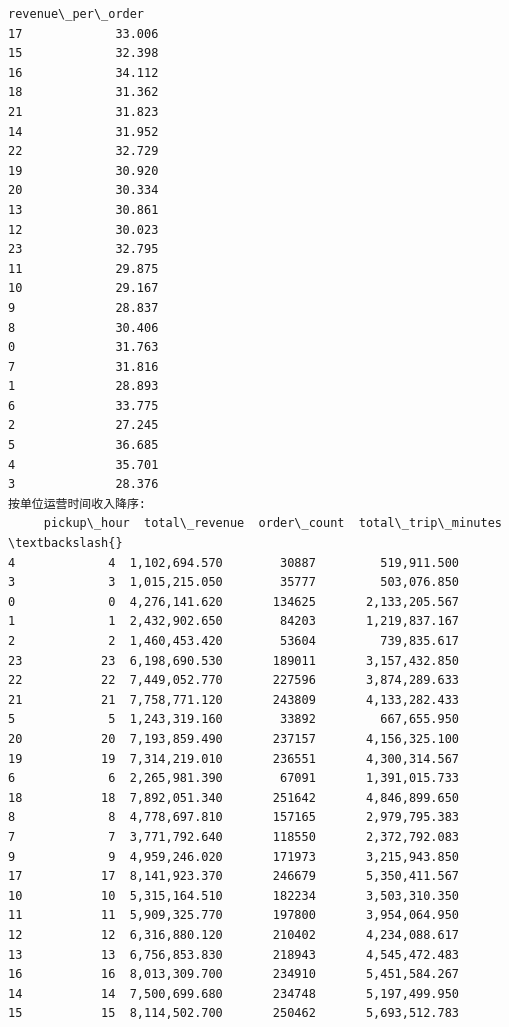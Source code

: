 \documentclass[11pt]{article}
\begin{document}
\begin{Verbatim}[commandchars=\\\{\}]
    revenue\_per\_order
17             33.006
15             32.398
16             34.112
18             31.362
21             31.823
14             31.952
22             32.729
19             30.920
20             30.334
13             30.861
12             30.023
23             32.795
11             29.875
10             29.167
9              28.837
8              30.406
0              31.763
7              31.816
1              28.893
6              33.775
2              27.245
5              36.685
4              35.701
3              28.376
按单位运营时间收入降序:
     pickup\_hour  total\_revenue  order\_count  total\_trip\_minutes  \textbackslash{}
4             4  1,102,694.570        30887         519,911.500
3             3  1,015,215.050        35777         503,076.850
0             0  4,276,141.620       134625       2,133,205.567
1             1  2,432,902.650        84203       1,219,837.167
2             2  1,460,453.420        53604         739,835.617
23           23  6,198,690.530       189011       3,157,432.850
22           22  7,449,052.770       227596       3,874,289.633
21           21  7,758,771.120       243809       4,133,282.433
5             5  1,243,319.160        33892         667,655.950
20           20  7,193,859.490       237157       4,156,325.100
19           19  7,314,219.010       236551       4,300,314.567
6             6  2,265,981.390        67091       1,391,015.733
18           18  7,892,051.340       251642       4,846,899.650
8             8  4,778,697.810       157165       2,979,795.383
7             7  3,771,792.640       118550       2,372,792.083
9             9  4,959,246.020       171973       3,215,943.850
17           17  8,141,923.370       246679       5,350,411.567
10           10  5,315,164.510       182234       3,503,310.350
11           11  5,909,325.770       197800       3,954,064.950
12           12  6,316,880.120       210402       4,234,088.617
13           13  6,756,853.830       218943       4,545,472.483
16           16  8,013,309.700       234910       5,451,584.267
14           14  7,500,699.680       234748       5,197,499.950
15           15  8,114,502.700       250462       5,693,512.783


\end{Verbatim}
\end{document}
